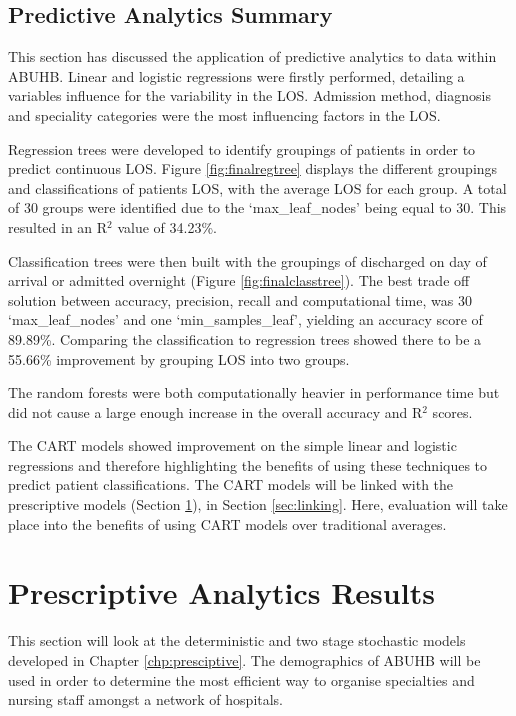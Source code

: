 \documentclass[../thesis.tex]{subfiles}
\begin{document}

\subsection{Predictive Analytics Summary}
This section has discussed the application of predictive analytics to data within ABUHB. Linear and logistic regressions were firstly performed, detailing a variables influence for the variability in the LOS. Admission method, diagnosis and speciality categories were the most influencing factors in the LOS.

Regression trees were developed to identify groupings of patients in order to predict continuous LOS. Figure \ref{fig:finalregtree} displays the different groupings and classifications of patients LOS, with the average LOS for each group. A total of 30 groups were identified due to the `max\_leaf\_nodes' being equal to 30. This resulted in an R$^{2}$ value of 34.23\%.

Classification trees were then built with the groupings of discharged on day of arrival or admitted overnight (Figure \ref{fig:finalclasstree}). The best trade off solution between accuracy, precision, recall and computational time, was 30 `max\_leaf\_nodes' and one `min\_samples\_leaf', yielding an accuracy score of 89.89\%. Comparing the classification to regression trees showed there to be a 55.66\% improvement by grouping LOS into two groups.

The random forests were both computationally heavier in performance time but did not cause a large enough increase in the overall accuracy and R$^{2}$ scores. 

The CART models showed improvement on the simple linear and logistic regressions and therefore highlighting the benefits of using these techniques to predict patient classifications. The CART models will be linked with the prescriptive models (Section \ref{sec:prescriptiveresults}), in Section \ref{sec:linking}. Here, evaluation will take place into the benefits of using CART models over traditional averages. 


\section{Prescriptive Analytics Results}\label{sec:prescriptiveresults}
This section will look at the deterministic and two stage stochastic models developed in Chapter \ref{chp:presciptive}. The demographics of ABUHB will be used in order to determine the most efficient way to organise specialties and nursing staff amongst a network of hospitals.
\end{document}
